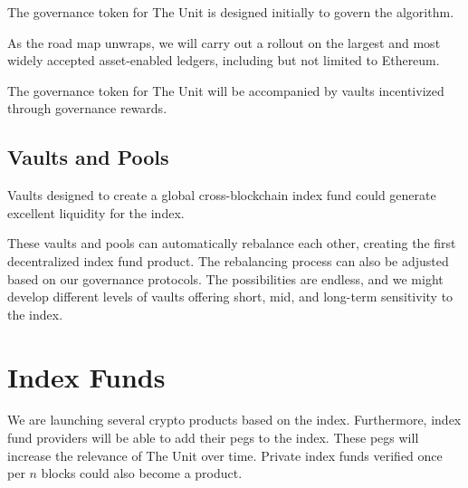 \documentclass[12pt]{article}
\begin{document}
The governance token for The Unit is designed initially to govern the algorithm. 

As the road map unwraps, we will carry out a rollout on the largest and most widely accepted asset-enabled ledgers, including but not limited to Ethereum.

The governance token for The Unit will be accompanied by vaults incentivized through governance rewards.


\subsection{Vaults and Pools}

Vaults designed to create a global cross-blockchain index fund could generate excellent liquidity for the index.

These vaults and pools can automatically rebalance each other, creating the first decentralized index fund product. The rebalancing process can also be adjusted based on our governance protocols. The possibilities are endless, and we might develop different levels of vaults offering short, mid, and long-term sensitivity to the index. 

\section{Index Funds}

We are launching several crypto products based on the index. Furthermore, index fund providers will be able to add their pegs to the index. These pegs will increase the relevance of The Unit over time. Private index funds verified once per $n$ blocks could also become a product. 
\end{document}
